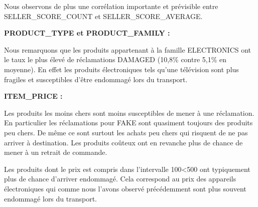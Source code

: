 Nous observons de plus une corrélation importante et prévisible entre SELLER_SCORE_COUNT et 
SELLER_SCORE_AVERAGE.

\textbf{PRODUCT_TYPE et PRODUCT_FAMILY :}

Nous remarquons que les produits appartenant à la famille ELECTRONICS ont le taux le plus 
élevé de réclamations DAMAGED (10,8\% contre 5,1\% en moyenne). En effet les produits
électroniques tels qu'une télévision sont plus fragiles et susceptibles d'être 
endommagé lors du transport.


\textbf{ITEM_PRICE :}

Les produits les moins chers sont moins susceptibles de mener à une réclamation.
En particulier les réclamations pour FAKE sont quasiment toujours des produits peu chers.
De même ce sont surtout les achats peu chers qui risquent de ne pas arriver à destination.
Les produits coûteux ont en revanche plus de chance de mener à un retrait de commande.

Les produits dont le prix est compris dans l'intervalle 100<500 ont typiquement plus de
chance d'arriver endommagé. Cela correspond au prix des appareils électroniques qui comme
nous l'avons observé précédemment sont plus souvent endommagé lors du transport.



























